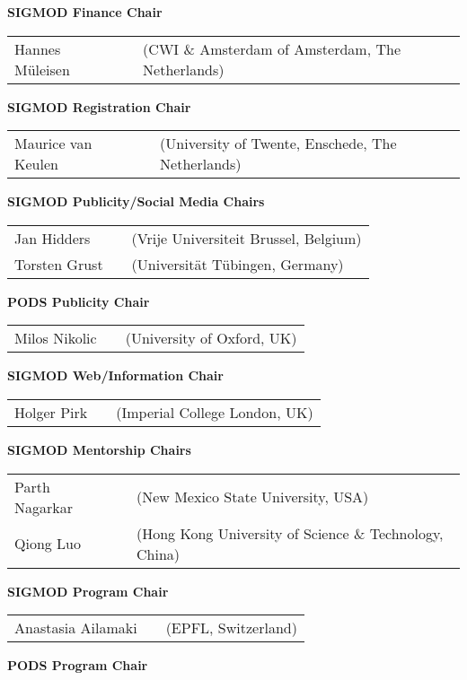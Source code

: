 {\vfill
\textbf{SIGMOD Finance Chair}

\begin{tabular}{lp{.5em}l}
Hannes M\"uleisen	&& \textsf{\footnotesize(CWI \& Amsterdam of Amsterdam, The Netherlands)}
\end{tabular}

\vfill
\textbf{SIGMOD Registration Chair}

\begin{tabular}{lp{.5em}l}
Maurice van Keulen	&& \textsf{\footnotesize(University of Twente, Enschede, The Netherlands)}
\end{tabular}

\vfill
\textbf{SIGMOD Publicity/Social Media Chairs}

\begin{tabular}{lp{.5em}l}
Jan Hidders	&& \textsf{\footnotesize(Vrije Universiteit Brussel, Belgium)}	\\
Torsten Grust	&& \textsf{\footnotesize(Universität Tübingen, Germany)}
\end{tabular}

\vfill
\textbf{PODS Publicity Chair}

\begin{tabular}{lp{.5em}l}
Milos Nikolic	&& \textsf{\footnotesize(University of Oxford, UK)}
\end{tabular}

\vfill
\textbf{SIGMOD Web/Information Chair}

\begin{tabular}{lp{.5em}l}
Holger Pirk	&& \textsf{\footnotesize(Imperial College London, UK)}
\end{tabular}

\vfill
\textbf{SIGMOD Mentorship Chairs}

\begin{tabular}{lp{.5em}l}
Parth Nagarkar	&& \textsf{\footnotesize(New Mexico State University, USA)}	\\
Qiong Luo	&& \textsf{\footnotesize(Hong Kong University of Science \& Technology, China)}
\end{tabular}

\pagebreak

\textbf{SIGMOD Program Chair}

\begin{tabular}{lp{.5em}l}
Anastasia Ailamaki	&& \textsf{\footnotesize(EPFL, Switzerland)}
\end{tabular}

\vfill
\textbf{PODS Program Chair}

}
